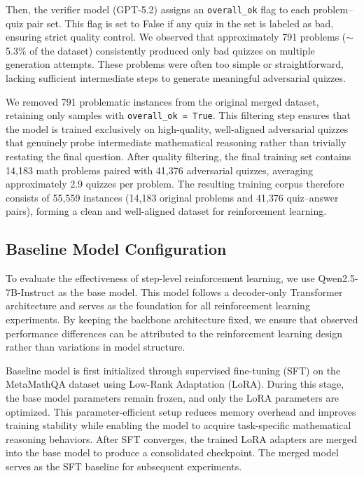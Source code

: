 \documentclass[12pt]{report}
\newcommand{\code}[1]{\colorbox{gray!15}{\texttt{#1}}}
\begin{document}
Then, the verifier model (GPT-5.2) assigns an \code{overall\_ok} flag to each problem--quiz pair set. This flag is set to False if any quiz in the set is labeled as bad, ensuring strict quality control. We observed that
approximately 791 problems ($\sim$5.3\% of the dataset) consistently produced only bad quizzes on multiple generation attempts. These problems were
often too simple or straightforward, lacking sufficient intermediate steps to generate meaningful adversarial quizzes.

We removed 791 problematic instances from the original merged dataset, retaining only samples with \code{overall\_ok = True}. This filtering step
ensures that the model is trained exclusively on high-quality, well-aligned adversarial quizzes that genuinely probe intermediate mathematical reasoning
rather than trivially restating the final question. After quality filtering, the final training set contains 14{,}183 math problems paired with 41{,}376
adversarial quizzes, averaging approximately 2.9 quizzes per problem. The resulting training corpus therefore consists of 55{,}559 instances (14{,}183
original problems and 41{,}376 quiz--answer pairs), forming a clean and well-aligned dataset for reinforcement learning.

\subsection{Baseline Model Configuration}
\label{sec:baseline_model_config}
To evaluate the effectiveness of step-level reinforcement learning, we use Qwen2.5-7B-Instruct as the base model. This model follows a decoder-only Transformer architecture and serves as the foundation for all reinforcement learning experiments. By keeping the backbone architecture fixed, we ensure that observed performance differences can be attributed to the reinforcement learning design rather than variations in model structure.

Baseline model is first initialized through supervised fine-tuning (SFT) on the MetaMathQA dataset using Low-Rank Adaptation (LoRA). During this stage, the base model parameters remain frozen, and only the LoRA parameters are optimized. This parameter-efficient setup reduces memory overhead and improves training stability while enabling the model to acquire task-specific mathematical reasoning behaviors.
After SFT converges, the trained LoRA adapters are merged into the base model to produce a consolidated checkpoint. The merged model serves as the SFT baseline for subsequent experiments.
\end{document}
